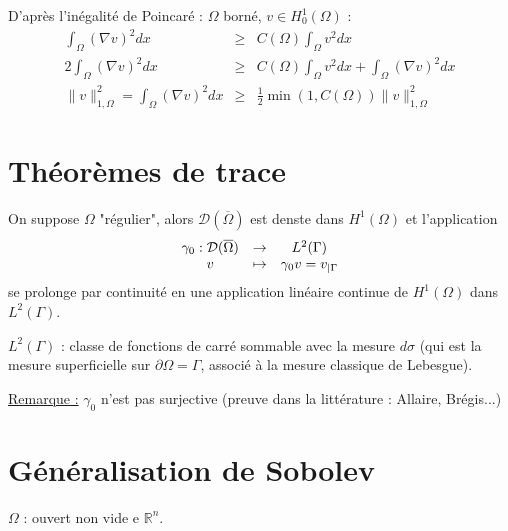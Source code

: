 
\begin{dem}
D'après l'inégalité de Poincaré : $\Omega$ borné, $v\in H_0^1(\Omega)$ :
\begin{eqnarray*}
	\int_{\Omega} (\nabla v)^2 dx &\geq& C(\Omega) \int_\Omega v^2 dx \\
	2\int_\Omega (\nabla v)^2 dx &\geq& C(\Omega) \int_\Omega v^2 dx + \int_\Omega (\nabla v)^2 dx \\
	\|v\|_{1,\Omega}^2 = \int_\Omega (\nabla v)^2 dx &\geq& \frac{1}{2} \min (1,C(\Omega)) \|v\|^2_{1,\Omega}
\end{eqnarray*}
\end{dem}

\section{Théorèmes de trace}
On suppose $\Omega$ "régulier", alors $\mathcal{D}(\overline{\Omega})$ est denste dans $H^1(\Omega)$ et l'application 
\[\begin{array}{c c c}\gamma_0 : \mathcal{D}(\overline{\Omega}) &\to& L^2(\Gamma) \\
					v			&\mapsto& \gamma_0 v = v_{|\Gamma} 
\end{array}\]
se prolonge par continuité en une application linéaire continue de $H^1(\Omega)$ dans $L^2(\Gamma)$.

\bigskip
$L^2(\Gamma)$ : classe de fonctions de carré sommable avec la mesure $d\sigma$ (qui est la mesure superficielle sur $\partial \Omega = \Gamma$, associé à la mesure classique de Lebesgue).

\bigskip
\underline{Remarque :} $\gamma_0$ n'est pas surjective (preuve dans la littérature : Allaire, Brégis...)

\section{Généralisation de Sobolev}
$\Omega$ : ouvert non vide e $\mathbb{R}^n$.


